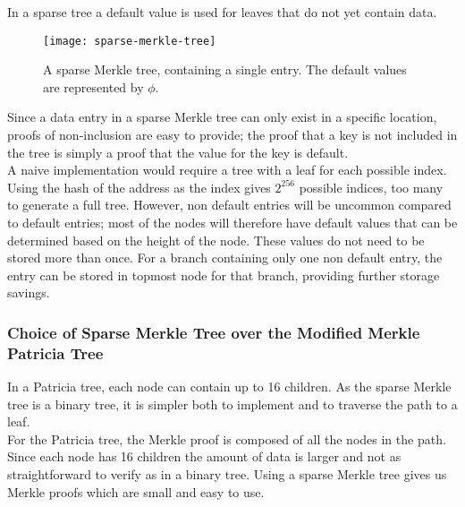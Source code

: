 In a sparse tree a default value is used for leaves that do not yet contain data.\\

\begin{figure}[h]
  \centering
  \captionsetup{format=hang, font=footnotesize}
 \caption{A sparse Merkle tree, containing a single entry. The default values are represented by $\phi$.}
\texttt{[image: sparse-merkle-tree]}
\end{figure}

Since a data entry in a sparse Merkle tree can only exist in a specific location, proofs of non-inclusion are easy to provide; the proof that a key is not included in the tree is simply a proof that the value for the key is default.\\

A naive implementation would require a tree with a leaf for each possible index. Using the hash of the address as the index gives $2^{256}$ possible indices, too many to generate a full tree. However, non default entries will be uncommon compared to default entries; most of the nodes will therefore have default values that can be determined based on the height of the node. These values do not need to be stored more than once. For a branch containing only one non default entry, the entry can be stored in topmost node for that branch, providing further storage savings.\\
 
\subsubsection{Choice of Sparse Merkle Tree over the Modified Merkle Patricia Tree}

In a Patricia tree, each node can contain up to 16 children. As the sparse Merkle tree is a binary tree, it is simpler both to implement and to traverse the path to a leaf.  \\

For the Patricia tree, the Merkle proof is composed of all the nodes in the path. Since each node has 16 children the amount of data is larger and not as straightforward to verify as in a binary tree. Using a sparse Merkle tree gives us Merkle proofs which are small and easy to use.\\

